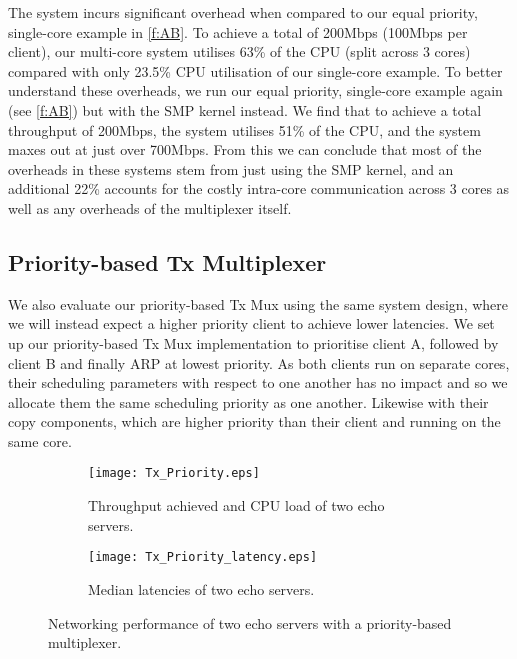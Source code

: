 The system incurs significant overhead when compared to our equal priority, single-core example in \autoref{f:AB}. To
achieve a total of 200Mbps (100Mbps per client), our multi-core system utilises 63\% of the CPU (split across 3 cores) compared with 
only 23.5\% CPU utilisation of our single-core example. To better understand these overheads, we run our equal priority, 
single-core example again (see \autoref{f:AB}) but with the SMP kernel instead. We find that to achieve
a total throughput of 200Mbps, the system utilises 51\% of the CPU, and the system maxes out at just over 700Mbps. 
From this we can conclude that most of the overheads in these systems stem 
from just using the SMP kernel, and an additional 22\% accounts for the costly intra-core communication across 3 cores as 
well as any overheads of the multiplexer itself. 

\subsection{Priority-based Tx Multiplexer}

We also evaluate our priority-based Tx Mux using the same system design, where we will instead expect a higher priority client to achieve lower
latencies. We set up our priority-based Tx Mux implementation to prioritise client A, followed by client B and finally ARP at lowest priority.
As both clients run on separate cores, their scheduling parameters with respect to one another has no impact and so we allocate them the same
scheduling priority as one another. Likewise with their copy components, which are higher priority than their client and running on the same core. 

\noindent\begin{figure}[h]
    \centering
	\begin{multicols}{2}
		\begin{subfigure}[b]{0.45\textwidth}
        \centering
        \texttt{[image: Tx\_Priority.eps]}
        \caption{Throughput achieved and CPU load of two echo servers.}
        \label{f:priority_mux}
    \end{subfigure}\qquad
    \begin{subfigure}[b]{0.45\textwidth}
        \vspace{52pt}
        \centering
        \texttt{[image: Tx\_Priority\_latency.eps]}
        \vspace{0.5pt}
        \caption{Median latencies of two echo servers.}
        \label{f:priority_latency}
    \end{subfigure}
\end{multicols}
\caption{Networking performance of two echo servers with a priority-based multiplexer.}
\end{figure}

